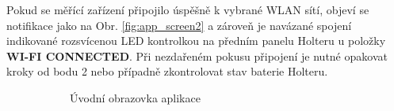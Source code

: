 Pokud se měřící zařízení připojilo úspěšně k vybrané WLAN sítí, objeví se
notifikace jako na Obr. \ref{fig:app_screen2} a zároveň je navázané spojení
indikované rozsvícenou LED kontrolkou na předním panelu Holteru u položky
\textbf{WI-FI CONNECTED}. Při nezdařeném pokusu připojení je nutné opakovat
kroky od bodu 2 nebo případně zkontrolovat stav baterie Holteru.

\begin{figure}[h]
    \centering
    \begin{subfigure}[b]{0.45\textwidth}
        \centering
        \textcolor{cyan}{\fboxrule=2pt\fboxsep=0pt}
        \caption{Úvodní obrazovka aplikace}
        \label{fig:app_screen1}
    \end{subfigure}
    \hfill
    \begin{subfigure}[b]{0.45\textwidth}
        \centering

\end{subfigure}
\end{figure}
